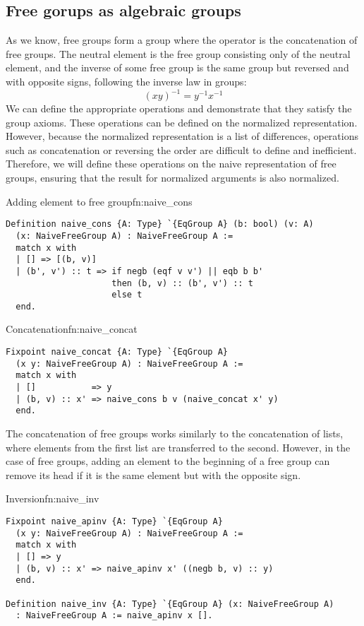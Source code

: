 \subsection{Free gorups as algebraic groups}
As we know, free groups form a group where the operator is the concatenation of free groups. The neutral element is the free group consisting only of the neutral element, and the inverse of some free group is the same group but reversed and with opposite signs, following the inverse law in groups:
$$
(xy)^{-1} = y^{-1}x^{-1}
$$
We can define the appropriate operations and demonstrate that they satisfy the group axioms. These operations can be defined on the normalized representation. However, because the normalized representation is a list of differences, operations such as concatenation or reversing the order are difficult to define and inefficient. Therefore, we will define these operations on the naive representation of free groups, ensuring that the result for normalized arguments is also normalized.
\begin{func}{Adding element to free group}{fn:naive_cons}
\begin{verbatim}
Definition naive_cons {A: Type} `{EqGroup A} (b: bool) (v: A) 
  (x: NaiveFreeGroup A) : NaiveFreeGroup A :=
  match x with
  | [] => [(b, v)]
  | (b', v') :: t => if negb (eqf v v') || eqb b b'
                     then (b, v) :: (b', v') :: t
                     else t
  end.
\end{verbatim}
\end{func}
\begin{func}{Concatenation}{fn:naive_concat}
\begin{verbatim}
Fixpoint naive_concat {A: Type} `{EqGroup A} 
  (x y: NaiveFreeGroup A) : NaiveFreeGroup A :=
  match x with
  | []           => y
  | (b, v) :: x' => naive_cons b v (naive_concat x' y)
  end.
\end{verbatim}
\end{func}
The concatenation of free groups  works similarly to the concatenation of lists, where elements from the first list are transferred to the second. However, in the case of free groups, adding an element to the beginning of a free group can remove its head if it is the same element but with the opposite sign.
\begin{func}{Inversion}{fn:naive_inv}
\begin{verbatim}
Fixpoint naive_apinv {A: Type} `{EqGroup A} 
  (x y: NaiveFreeGroup A) : NaiveFreeGroup A :=
  match x with
  | [] => y
  | (b, v) :: x' => naive_apinv x' ((negb b, v) :: y)
  end.

Definition naive_inv {A: Type} `{EqGroup A} (x: NaiveFreeGroup A) 
  : NaiveFreeGroup A := naive_apinv x [].
\end{verbatim}
\end{func}
